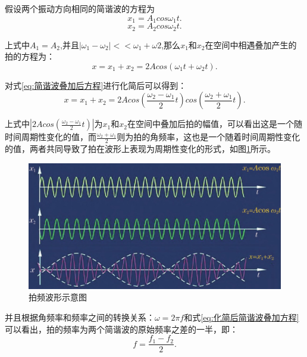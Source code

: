 假设两个振动方向相同的简谐波的方程为
\begin{equation}\label{eq:简谐波方程1}
    x_1=A_1cos\omega_1t.
\end{equation}
\begin{equation}\label{eq:简谐波方程2}
    x_2=A_2cos\omega_2t.
\end{equation}

上式中\(A_1=A_2\),并且\(|\omega_1-\omega_2|<<\omega_1+\omega2\),那么\(x_1\)和\(x_2\)在空间中相遇叠加产生的拍的方程为：
\begin{equation}\label{eq:简谐波叠加后方程}
   x=x_1+x_2=2Acos(\omega_1t+\omega_2t).
\end{equation}

对式\eqref{eq:简谐波叠加后方程}进行化简后可以得到：
\begin{equation}\label{eq:化简后简谐波叠加方程}
  x=x_1+x_2=2Acos(\frac{\omega_2-\omega_1}{2}t)cos(\frac{\omega_2+\omega_1}{2}t).
\end{equation}

上式中\(|2Acos(\frac{\omega_2-\omega_1}{2}t)|\)为\(x_1\)和\(x_2\)在空间中叠加后拍的幅值，可以看出这是一个随时间周期性变化的值，而\(\frac{\omega_2+\omega_1}{2}\)则为拍的角频率，这也是一个随着时间周期性变化的值，两者共同导致了拍在波形上表现为周期性变化的形式，如图\ref{fig:拍频波形示意图}所示。
\begin{figure}[htb]
  \centering
  \includegraphics[width=12cm]{fig/2-fig/拍频波形示意图.jpg}
  \caption{拍频波形示意图\cite{张志平2022激光外差干涉技术在光刻机中的应用}}
  \label{fig:拍频波形示意图}
  \end{figure}

并且根据角频率和频率之间的转换关系：\(\omega=2\pi f\)和式\eqref{eq:化简后简谐波叠加方程}可以看出，拍的频率为两个简谐波的原始频率之差的一半，即：
\begin{equation}\label{eq:合成拍与原始简谐波之间的频率关系}
  f=\frac{f_1-f_2}{2}.
\end{equation}

